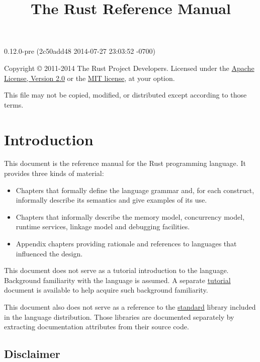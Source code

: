 \documentclass[]{article}
\title{The Rust Reference Manual}
\begin{document}
\maketitle

0.12.0-pre (2c50add48 2014-07-27 23:03:52 -0700)

Copyright © 2011-2014 The Rust Project Developers. Licensed under the
\href{http://www.apache.org/licenses/LICENSE-2.0}{Apache License,
Version 2.0} or the \href{http://opensource.org/licenses/MIT}{MIT
license}, at your option.

This file may not be copied, modified, or distributed except according
to those terms.

{
\hypersetup{linkcolor=black}
\setcounter{tocdepth}{3}
\tableofcontents
}
\section{Introduction}\label{introduction}

This document is the reference manual for the Rust programming language.
It provides three kinds of material:

\begin{itemize}
\itemsep1pt\parskip0pt
\item
  Chapters that formally define the language grammar and, for each
  construct, informally describe its semantics and give examples of its
  use.
\item
  Chapters that informally describe the memory model, concurrency model,
  runtime services, linkage model and debugging facilities.
\item
  Appendix chapters providing rationale and references to languages that
  influenced the design.
\end{itemize}

This document does not serve as a tutorial introduction to the language.
Background familiarity with the language is assumed. A separate
\href{tutorial.html}{tutorial} document is available to help acquire
such background familiarity.

This document also does not serve as a reference to the
\href{std/index.html}{standard} library included in the language
distribution. Those libraries are documented separately by extracting
documentation attributes from their source code.

\subsection{Disclaimer}\label{disclaimer}
\end{document}
